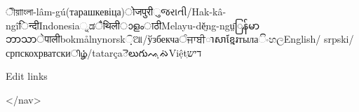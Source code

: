 \documentclass{article}\usepackage{titlesec}
\begin{document}
		
		\begin{itemize}\itemAfrikaans\itemAlemannisch{}ীয়া\itemAsturianu{}াংলা-lâm-gú (тарашкевіца)ोजपुरी\itemBosanski\itemBrezhoneg{}\itemCorsu\itemCymraeg\itemDansk\itemDeutsch\itemEesti{}\itemEsperanto\itemEuskara{}\itemGaeilge\itemGalego{}ુજરાતી/Hak-kâ-ngîिन्दी\itemHrvatski\itemBahasa Indonesia\itemInterlingua\itemIsiXhosa{}\itemItaliano{}\itemJawa{}್ನಡ\itemKiswahili{}\itemLatina{}\itemLombard\itemMagyar{}ैथिली\itemMalagasy{}ാളംाठी\itemBahasa Melayu-dĕ̤ng-ngṳ̄ြန်မာဘာသာ\itemNederlands{}ेपाली\itemNorsk bokmål\itemNorsk nynorsk\itemOccitan{}଼ିଆ/ўзбекчаੰਜਾਬੀាសាខ្មែរ\itemPolski{} тыла\itemScots\itemShqip{}ිංහල\itemSimple English / srpski\itemSrpskohrvatski / српскохрватски\itemSuomi\itemSvenska\itemTagalog{}ிழ்\itemTaqbaylit{}/tatarçaెలుగు ᨕᨘᨁᨗ Việt\itemWinaray{}ִדיש\end{itemize}
		Edit links
	
</nav>
\end{document}

